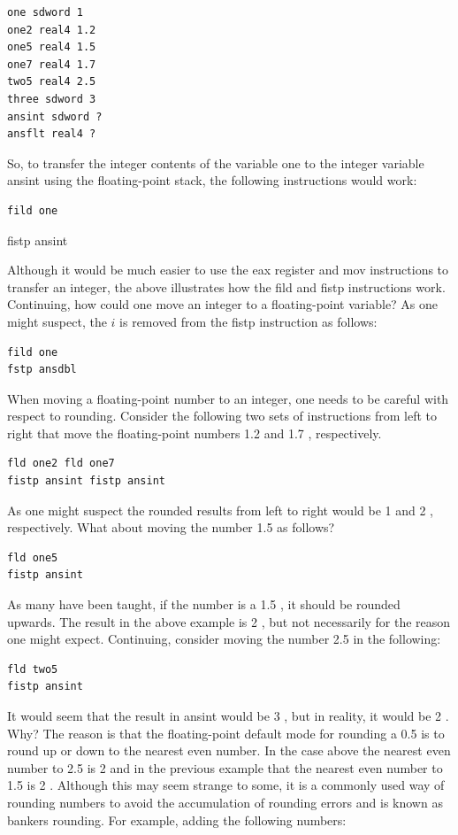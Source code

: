 \documentclass[10pt]{book}
\begin{document}
\begin{center}
\begin{center}
\begin{center}
\begin{center}
\begin{verbatim}
one sdword 1
one2 real4 1.2
one5 real4 1.5
one7 real4 1.7
two5 real4 2.5
three sdword 3
ansint sdword ?
ansflt real4 ?
\end{verbatim}

So, to transfer the integer contents of the variable one to the integer variable ansint using the floating-point stack, the following instructions would work:

\begin{verbatim}
fild one
\end{verbatim}

fistp ansint

Although it would be much easier to use the eax register and mov instructions to transfer an integer, the above illustrates how the fild and fistp instructions work. Continuing, how could one move an integer to a floating-point variable? As one might suspect, the $i$ is removed from the fistp instruction as follows:

\begin{verbatim}
fild one
fstp ansdbl
\end{verbatim}

When moving a floating-point number to an integer, one needs to be careful with respect to rounding. Consider the following two sets of instructions from left to right that move the floating-point numbers 1.2 and 1.7 , respectively.


\begin{verbatim}
fld one2 fld one7
fistp ansint fistp ansint
\end{verbatim}

As one might suspect the rounded results from left to right would be 1 and 2 , respectively. What about moving the number 1.5 as follows?

\begin{verbatim}
fld one5
fistp ansint
\end{verbatim}

As many have been taught, if the number is a 1.5 , it should be rounded upwards. The result in the above example is 2 , but not necessarily for the reason one might expect. Continuing, consider moving the number 2.5 in the following:

\begin{verbatim}
fld two5
fistp ansint
\end{verbatim}

It would seem that the result in ansint would be 3 , but in reality, it would be 2 . Why? The reason is that the floating-point default mode for rounding a 0.5 is to round up or down to the nearest even number. In the case above the nearest even number to 2.5 is 2 and in the previous example that the nearest even number to 1.5 is 2 . Although this may seem strange to some, it is a commonly used way of rounding numbers to avoid the accumulation of rounding errors and is known as bankers rounding. For example, adding the following numbers:


\end{center}
\end{center}
\end{center}
\end{center}
\end{document}
